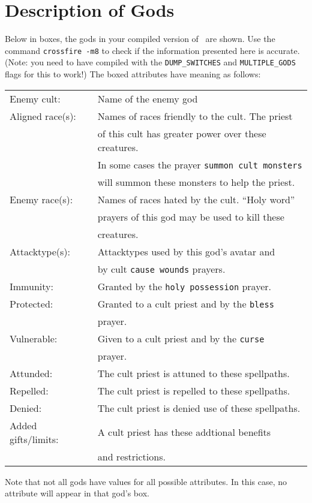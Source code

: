 \chapter{Description of Gods}
\label{app:gods}

Below in boxes, the gods in your compiled version of \cf\ are shown.
Use the command {\tt crossfire -m8} to check if the information
presented here is accurate.
(Note: you need to have compiled with the {\tt DUMP\_SWITCHES} and
{\tt MULTIPLE\_GODS} flags for this to work!) The boxed attributes
have meaning as follows:
\vskip 12pt
\begin{tabular}{ll}
Enemy cult: & Name of the enemy god \\
Aligned race(s): & Names of races friendly to the cult. The priest \\
	 & of this cult has greater power over these creatures. \\
	 & In some cases the prayer {\tt summon cult monsters} \\
	 & will summon these monsters to help the priest. \\
Enemy race(s): & Names of races hated by the cult. ``Holy word'' \\
	 & prayers of this god may be used to kill these \\
	 & creatures. \\
Attacktype(s): & Attacktypes used by this god's avatar and \\
	 & by cult {\tt cause wounds} prayers. \\
Immunity: & Granted by the {\tt holy possession} prayer. \\
Protected: & Granted to a cult priest and by the {\tt bless} \\
	 & prayer. \\
Vulnerable: & Given to a cult priest and by the {\tt curse } \\
	 & prayer. \\
Attunded: & The cult priest is attuned to these spellpaths. \\
Repelled: & The cult priest is repelled to these spellpaths. \\
Denied: & The cult priest is denied use of these spellpaths. \\
Added gifts/limits: & A cult priest has these addtional benefits\\
 	& and restrictions. \\
\end{tabular}
\vskip 12pt
Note that not all gods have values for all possible attributes. In
this case, no attribute will appear in that god's box.

\begin{longtable}{|p{4cm}p{9cm}|} \hline

\end{longtable}


